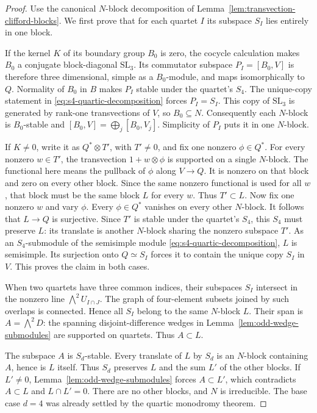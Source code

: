 \begin{proof}
Use the canonical $N$-block decomposition of
Lemma~\ref{lem:transvection-clifford-blocks}.  We first prove that for
each quartet $I$ its subspace $S_I$ lies entirely in one block.

If the kernel $K$ of its boundary group $B_0$ is zero, the cocycle
calculation makes $B_0$ a conjugate block-diagonal $\mathrm{SL}_3$.
Its commutator subspace $P_I=[B_0,V]$ is therefore three dimensional,
simple as a $B_0$-module, and maps isomorphically to $Q$.  Normality
of $B_0$ in $B$ makes $P_I$ stable under the quartet's $S_4$.
The unique-copy statement in \eqref{eq:s4-quartic-decomposition}
forces $P_I=S_I$.  This copy of $\mathrm{SL}_3$ is generated by
rank-one transvections of $V$, so $B_0\subseteq N$.  Consequently
each $N$-block is $B_0$-stable and
$[B_0,V]=\bigoplus_j[B_0,V_j]$.  Simplicity of $P_I$ puts it in one
$N$-block.

If $K\ne0$, write it as $Q^*\otimes T'$, with $T'\ne0$, and fix
one nonzero $\phi\in Q^*$.  For every nonzero $w\in T'$, the
transvection $1+w\otimes\phi$ is supported on a single $N$-block.
The functional here means the pullback of $\phi$ along $V\to Q$.
It is nonzero on that block and zero on every other block.  Since
the same nonzero functional is used for all $w$, that block must
be the same block $L$ for every $w$.  Thus $T'\subset L$.
Now fix one nonzero $w$ and vary $\phi$.  Every $\phi\in Q^*$
vanishes on every other $N$-block.  It follows that $L\to Q$ is
surjective.  Since $T'$ is stable under the quartet's $S_4$, this
$S_4$ must preserve $L$: its translate is another $N$-block sharing
the nonzero subspace $T'$.  As an $S_4$-submodule of the semisimple
module \eqref{eq:s4-quartic-decomposition}, $L$ is semisimple.
Its surjection onto $Q\simeq S_I$ forces it to contain the unique
copy $S_I$ in $V$.  This proves the claim in both cases.

When two quartets have three common indices, their subspaces $S_I$
intersect in the nonzero line $\bigwedge^2U_{I\cap J}$.
The graph of four-element subsets joined by such overlaps is
connected.  Hence all $S_I$ belong to the same $N$-block $L$.
Their span is $A=\bigwedge^2D$: the spanning disjoint-difference
wedges in Lemma~\ref{lem:odd-wedge-submodules} are supported on
quartets.  Thus $A\subset L$.

The subspace $A$ is $S_d$-stable.  Every translate of $L$ by $S_d$
is an $N$-block containing $A$, hence is $L$ itself.  Thus $S_d$
preserves $L$ and the sum $L'$ of the other blocks.  If $L'\ne0$,
Lemma~\ref{lem:odd-wedge-submodules} forces $A\subset L'$, which
contradicts $A\subset L$ and $L\cap L'=0$.  There are no other
blocks, and $N$ is irreducible.  The base case $d=4$ was already
settled by the quartic monodromy theorem.
\end{proof}

